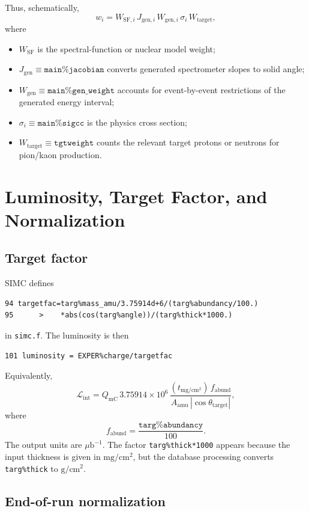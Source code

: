 \documentclass[11pt]{article}
\newcommand{\ub}{\mu\mathrm{b}}
\begin{document}
Thus, schematically,
\[
  w_i
  =
  W_{\mathrm{SF},i}\,
  J_{\mathrm{gen},i}\,
  W_{\mathrm{gen},i}\,
  \sigma_i\,
  W_{\mathrm{target}},
\]
where
\begin{itemize}
  \item \(W_{\mathrm{SF}}\) is the spectral-function or nuclear model weight;
  \item \(J_{\mathrm{gen}}\equiv\texttt{main\%jacobian}\) converts generated
        spectrometer slopes to solid angle;
  \item \(W_{\mathrm{gen}}\equiv\texttt{main\%gen\_weight}\) accounts for event-by-event
        restrictions of the generated energy interval;
  \item \(\sigma_i\equiv\texttt{main\%sigcc}\) is the physics cross section;
  \item \(W_{\mathrm{target}}\equiv\texttt{tgtweight}\) counts the relevant target
        protons or neutrons for pion/kaon production.
\end{itemize}

\section{Luminosity, Target Factor, and Normalization}

\subsection{Target factor}

SIMC defines
\begin{lstlisting}
94 targetfac=targ%mass_amu/3.75914d+6/(targ%abundancy/100.)
95      >    *abs(cos(targ%angle))/(targ%thick*1000.)
\end{lstlisting}
in \texttt{simc.f}.  The luminosity is then
\begin{lstlisting}
101 luminosity = EXPER%charge/targetfac
\end{lstlisting}

Equivalently,
\[
  \mathcal{L}_{\mathrm{int}}
  =
  Q_{\mathrm{mC}}\,
  3.75914\times 10^6\,
  \frac{(t_{\mathrm{mg/cm^2}})\,f_{\mathrm{abund}}}
       {A_{\mathrm{amu}}\,|\cos\theta_{\mathrm{target}}|},
\]
where
\[
  f_{\mathrm{abund}} = \frac{\texttt{targ\%abundancy}}{100}.
\]
The output units are \(\ub^{-1}\).  The factor \texttt{targ\%thick*1000}
appears because the input thickness is given in \(\mathrm{mg/cm^2}\), but the
database processing converts \texttt{targ\%thick} to \(\mathrm{g/cm^2}\).

\subsection{End-of-run normalization}
\end{document}
